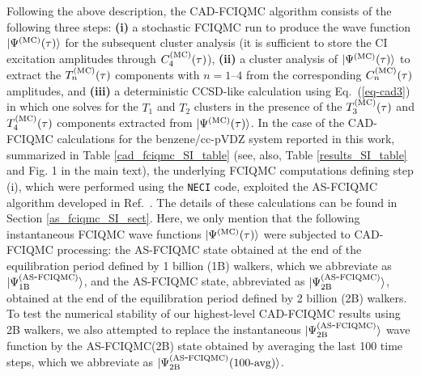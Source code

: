 \documentclass[journal=jcp,manuscript=suppinfo]{achemso}
\begin{document}
Following the above description, the CAD-FCIQMC algorithm consists of the following three steps:
\cite{piecuch_monte_carlo_cc_jcp_2018}
{\bf (i)} a stochastic FCIQMC run to produce the wave function $|\Psi^{\rm (MC)}(\tau)\rangle$ for the subsequent
cluster analysis (it is sufficient to store the CI excitation amplitudes through $C_{4}^{\rm (MC)}(\tau)$),
{\bf (ii)} a cluster analysis of $|\Psi^{\rm (MC)}(\tau)\rangle$ to extract the $T_{n}^{\rm (MC)}(\tau)$ components
with $n = \mbox{1--4}$ from the corresponding $C_{n}^{\rm (MC)}(\tau)$ amplitudes, and
{\bf (iii)} a deterministic CCSD-like calculation using Eq.\ (\ref{eq-cad3}) in which one solves for the
$T_{1}$ and $T_{2}$ clusters in the presence of the $T_{3}^{\rm (MC)}(\tau)$ and $T_{4}^{\rm (MC)}(\tau)$
components extracted from $|\Psi^{\rm (MC)}(\tau)\rangle$. In the case of the CAD-FCIQMC calculations
for the benzene/cc-pVDZ system reported in this work, summarized in Table \ref{cad_fciqmc_SI_table}
(see, also, Table \ref{results_SI_table} and Fig. 1 in the main text), the underlying FCIQMC
computations defining step (i), which were performed using the {\texttt{NECI}} code,\cite{neci}
exploited the AS-FCIQMC algorithm developed in Ref.\ .
The details of these calculations can be found in Section \ref{as_fciqmc_SI_sect}.
Here, we only mention that the following instantaneous FCIQMC wave functions $|\Psi^{\rm (MC)}(\tau)\rangle$
were subjected to CAD-FCIQMC processing: the AS-FCIQMC state obtained at the end of the equilibration
period defined by 1 billion (1B) walkers, which we abbreviate as $|\Psi_{\rm 1B}^{\rm (AS\mbox{-}FCIQMC)}\rangle$,
and the AS-FCIQMC state, abbreviated as $|\Psi_{\rm 2B}^{\rm (AS\mbox{-}FCIQMC)}\rangle$, obtained at the end
of the equilibration period defined by 2 billion (2B) walkers. To test the numerical stability of our highest-level
CAD-FCIQMC results using 2B walkers, we also attempted to replace the instantaneous
$|\Psi_{\rm 2B}^{\rm (AS\mbox{-}FCIQMC)}\rangle$ wave function by the AS-FCIQMC(2B) state obtained by
averaging the last 100 time steps, which we abbreviate as
$|\Psi_{\rm 2B}^{\rm (AS\mbox{-}FCIQMC)}\mbox{(100-avg)}\rangle$.
\end{document}
